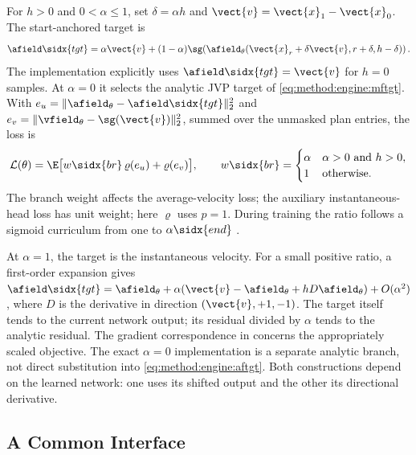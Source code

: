 For $h>0$ and $0<\alpha\le1$, set $\delta=\alpha h$ and
$\vect{v}=\vect{x}_{1}-\vect{x}_{0}$. The start-anchored target is
\begin{equation}\label{eq:method:engine:aftgt}
  \afield\sidx{tgt}
  =\alpha\vect{v}+(1-\alpha)\sg\!\left(
    \afield_{\theta}(\vect{x}_{r}+\delta\vect{v},r+\delta,h-\delta)\right).
\end{equation}
The implementation explicitly uses $\afield\sidx{tgt}=\vect{v}$ for $h=0$ samples. At
$\alpha=0$ it selects the analytic JVP target of \eqref{eq:method:engine:mftgt}.
With $e_u=\|\afield_{\theta}-\afield\sidx{tgt}\|_2^2$ and
$e_v=\|\vfield_{\theta}-\sg(\vect{v})\|_2^2$, summed over the unmasked plan entries, the loss is
\begin{equation}\label{eq:method:engine:afloss}
  \mathcal{L}(\theta)=\E\big[w\sidx{br}\,\varrho(e_u)+\varrho(e_v)\big],
  \qquad
  w\sidx{br}=\begin{cases}
    \alpha & \alpha>0\text{ and }h>0,\\
    1 & \text{otherwise}.
  \end{cases}
\end{equation}
The branch weight affects the average-velocity loss; the auxiliary instantaneous-head loss has
unit weight; here $\varrho$ uses $p=1$. During training the ratio follows a sigmoid curriculum from one to
$\alpha\sidx{end}$ \parencite[Alg.~2]{zhang2025alphaflow}.

At $\alpha=1$, the target is the instantaneous velocity. For a small positive ratio, a first-order
expansion gives $\afield\sidx{tgt}=\afield_{\theta}
+\alpha(\vect{v}-\afield_{\theta}+hD\afield_{\theta})+O(\alpha^2)$, where $D$ is the derivative
in direction $(\vect{v},+1,-1)$. The target itself tends to the current network output;
its residual divided by $\alpha$ tends to the analytic residual. The gradient correspondence in
\parencite[Thm.~1]{zhang2025alphaflow} concerns the appropriately scaled objective. The exact
$\alpha=0$ implementation is a separate analytic branch, not direct substitution into
\eqref{eq:method:engine:aftgt}. Both constructions depend on the learned network: one uses its
shifted output and the other its directional derivative.

\subsection{A Common Interface}\label{sec:method:interface}

